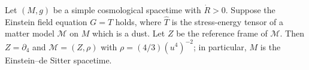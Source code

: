 Let $(M, g)$ be a simple cosmological spacetime with $\dot{R} > 0$. Suppose the Einstein field equation $G = T$ holds, where $\hat{T}$ is the stress-energy tensor of a matter model $\mathcal{M}$ on $M$ which is a dust. Let $Z$ be the reference frame of $\mathcal{M}$. Then $Z = \partial_4$ and $\mathcal{M} = (Z, \rho)$ with $\rho = (4/3)(u^4)^{-2}$; in particular, $M$ is the Einstein--de Sitter spacetime.
